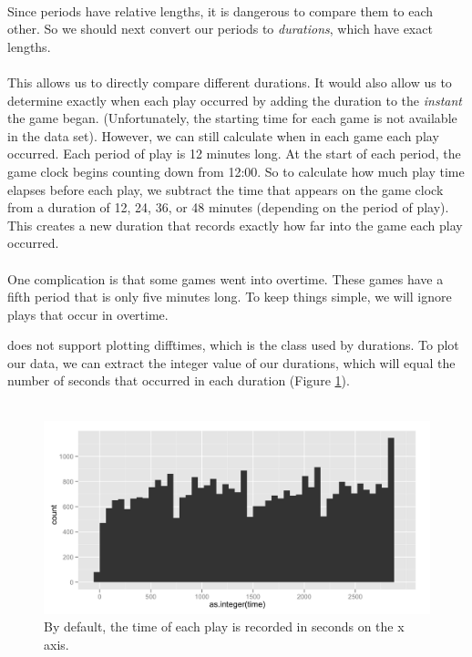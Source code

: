 \documentclass[article]{jss}
\begin{document}
\\

Since periods have relative lengths, it is dangerous to compare them to each other. So we should next convert our periods to \emph{durations}, which have exact lengths.\\

\\

This allows us to directly compare different durations. It would also allow us to determine exactly when each play occurred by adding the duration to the \emph{instant} the game began. (Unfortunately, the starting time for each game is not available in the data set). However, we can still calculate when in each game each play occurred. Each period of play is 12 minutes long. At the start of each period, the game clock begins counting down from 12:00. So to calculate how much play time elapses before each play, we subtract the time that appears on the game clock from a duration of 12, 24, 36, or 48 minutes (depending on the period of play). This creates a new duration that records exactly how far into the game each play occurred.\\

\\

One complication is that some games went into overtime. These games have a fifth period that is only five minutes long. To keep things simple, we will ignore plays that occur in overtime.\\


 does not support plotting difftimes, which is the class used by durations. To plot our data, we can extract the integer value of our durations, which will equal the number of seconds that occurred in each duration (Figure \ref{fig:plays}).\\

\\

\begin{figure}[htpb]
  \centering
  \includegraphics[width=\textwidth]{play-time-histogram.png}        
  \caption{By default, the time of each play is recorded in seconds on the x axis.}
  \label{fig:plays}
\end{figure}
\end{document}
